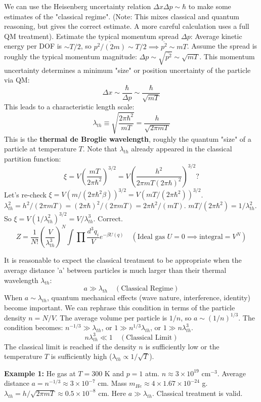 \documentclass[11pt]{article}
\newcommand{\avg}[1]{\overline{#1}}
\newcommand{\lambdaT}{\lambda_{th}} %
\begin{document}
We can use the Heisenberg uncertainty relation $\Delta x \Delta p \sim \hbar$ to make some estimates of the "classical regime". (Note: This mixes classical and quantum reasoning, but gives the correct estimate. A more careful calculation uses a full QM treatment).
Estimate the typical momentum spread $\Delta p$: Average kinetic energy per DOF is $\sim T/2$, so $\avg{p^2 / (2m)} \sim T/2 \implies \avg{p^2} \sim mT$. Assume the spread is roughly the typical momentum magnitude: $\Delta p \sim \sqrt{\avg{p^2}} \sim \sqrt{mT}$.
This momentum uncertainty determines a minimum "size" or position uncertainty of the particle via QM:
\[ \Delta x \sim \frac{\hbar}{\Delta p} \sim \frac{\hbar}{\sqrt{mT}} \]
This leads to a characteristic length scale:
\[ \lambdaT \equiv \sqrt{\frac{2\pi\hbar^2}{mT}} = \frac{h}{\sqrt{2\pi m T}} \]
This is the \textbf{thermal de Broglie wavelength}, roughly the quantum "size" of a particle at temperature $T$. Note that $\lambdaT$ already appeared in the classical partition function:
\[ \xi = V \left( \frac{mT}{2\pi\hbar^2} \right)^{3/2} = V \left( \frac{h^2}{2\pi m T (2\pi\hbar)^2} \right)^{3/2} ? \]
Let's re-check $\xi = V (m / (2\pi\hbar^2\beta))^{3/2} = V (mT / (2\pi\hbar^2))^{3/2}$.
$\lambdaT^2 = h^2 / (2\pi m T) = (2\pi\hbar)^2 / (2\pi m T) = 2\pi\hbar^2 / (mT)$.
$mT / (2\pi\hbar^2) = 1/\lambdaT^2$.
So $\xi = V (1/\lambdaT^2)^{3/2} = V / \lambdaT^3$. Correct.
\[ Z = \frac{1}{N!} \left( \frac{V}{\lambdaT^3} \right)^N \int \prod \frac{d^3 q_i}{V} e^{-\beta U(q)} \quad (\text{Ideal gas } U=0 \implies \text{integral}=V^N) \]

It is reasonable to expect the classical treatment to be appropriate when the average distance 'a' between particles is much larger than their thermal wavelength $\lambdaT$:
\[ a \gg \lambdaT \quad (\text{Classical Regime}) \]
When $a \sim \lambdaT$, quantum mechanical effects (wave nature, interference, identity) become important.
We can rephrase this condition in terms of the particle density $n = N/V$. The average volume per particle is $1/n$, so $a \sim (1/n)^{1/3}$.
The condition becomes: $n^{-1/3} \gg \lambdaT$, or $1 \gg n^{1/3} \lambdaT$, or $1 \gg n \lambdaT^3$.
\[ n \lambdaT^3 \ll 1 \quad (\text{Classical Limit}) \]
The classical limit is reached if the density $n$ is sufficiently low or the temperature $T$ is sufficiently high ($\lambdaT \propto 1/\sqrt{T}$).

\textbf{Example 1:} He gas at $T=300$ K and $p=1$ atm.
$n \approx 3 \times 10^{19}$ cm$^{-3}$. Average distance $a = n^{-1/3} \approx 3 \times 10^{-7}$ cm.
Mass $m_{He} \approx 4 \times 1.67 \times 10^{-24}$ g.
$\lambdaT = h / \sqrt{2\pi m T} \approx 0.5 \times 10^{-8}$ cm.
Here $a \gg \lambdaT$. Classical treatment is valid.
\end{document}

